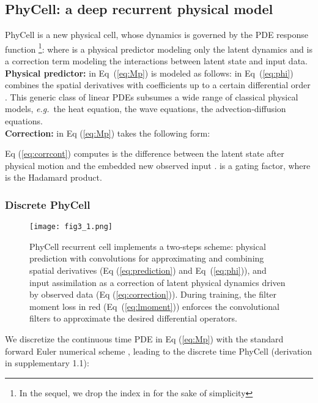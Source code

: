 \documentclass[10pt,twocolumn,letterpaper]{article}
\def\eg{\textit{e.g.}~}
\begin{document}
\subsection{PhyCell: a deep recurrent physical model}
\label{section:phycell}

PhyCell is a new physical cell, whose dynamics is governed by the PDE response function \footnote{In the sequel, we drop the index  in  for the sake of simplicity}: 
where  is a physical predictor modeling only the latent dynamics and  is a correction term  modeling the interactions between latent state and input data. \vspace{0.25cm} \\
\textbf{Physical predictor:}  in Eq~(\ref{eq:Mp}) is modeled as follows: 
 in Eq~(\ref{eq:phi}) combines the spatial derivatives with coefficients  up to a certain differential order . This generic class of linear PDEs subsumes a wide range of classical physical models, \eg the heat equation, the wave equations, the advection-diffusion equations. \vspace{0.25cm} \\
\textbf{Correction:}  in Eq (\ref{eq:Mp}) takes the following form: 

Eq (\ref{eq:corrcont}) computes is the difference between the latent state after physical motion  and the embedded new observed input .  is a gating  factor, where  is the Hadamard product.

 
 

\subsubsection{Discrete PhyCell} 
\label{sec:discretephicell}
\begin{figure}
    \centering
    \texttt{[image: fig3\_1.png]}
    \caption{PhyCell recurrent cell implements a two-steps scheme: physical prediction with convolutions for approximating and combining spatial derivatives (Eq (\ref{eq:prediction}) and Eq~(\ref{eq:phi})), and input assimilation as a correction of latent physical dynamics driven by observed data (Eq (\ref{eq:correction})). During training, the filter moment loss in red (Eq~(\ref{eq:lmoment})) enforces the convolutional filters to approximate the desired differential operators.}
    \label{fig:phicell}
\end{figure}

We discretize the  continuous time PDE in Eq (\ref{eq:Mp}) with the standard forward Euler numerical scheme \cite{lu2018beyond}, leading to the discrete time PhyCell (derivation in supplementary 1.1):
\end{document}
